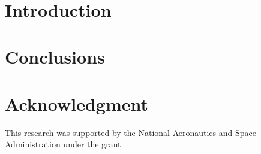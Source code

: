 \documentclass[letterpaper, 10 pt, conference]{ieeeconf}
\begin{document}
\newtheorem{lem}{\bf Lemma}%
\newtheorem{rem}{\bf Remark}%
\newtheorem{pro}{\bf Proposition}%
\newtheorem{defn}{\bf Definition}%
\newtheorem{thm}{\bf Theorem}%
\newtheorem{assu}{Assumption}%
\newcommand{\tr}{{\rm tr}}
\newcommand{\ts}{& \hspace{-0.05in}}
\newcommand{\nn}{\nonumber}
\newtheorem{ex}{Example}[section]
\newcommand{\bp}{\bigskip}
\newcommand{\slp}{\smallskip}
\newcommand{\diag}{{\rm diag}}
\newcommand{\sign}{{\rm sign}}
\baselineskip 0.41cm
\newcommand{\rank}{{\rm rank}}
\newcommand{\qed}{\hfill \ensuremath{\Box}}




\title{\bf \LARGE }

\author{}
\date{}
\maketitle


\begin{abstract}

\end{abstract}




\section{\bf Introduction}



\section{\bf Conclusions}


\section*{Acknowledgment}
This research was supported by the National Aeronautics and Space Administration under the grant

%
\end{document}
